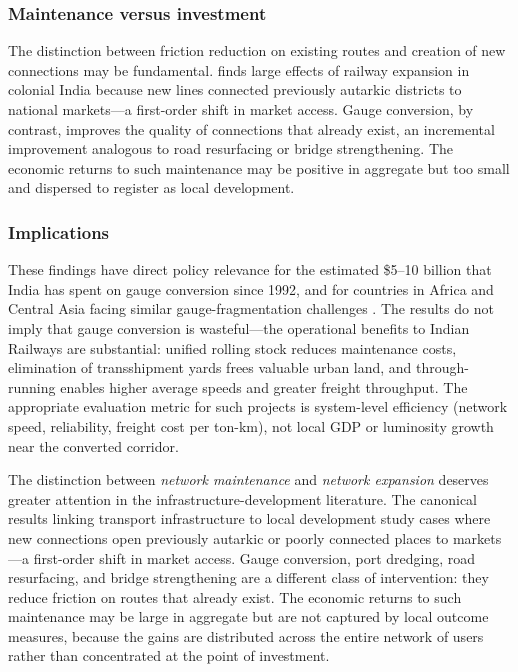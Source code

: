 \documentclass[12pt]{article}
\begin{document}
\subsubsection*{Maintenance versus investment} The distinction between friction reduction on existing routes and creation of new connections may be fundamental. \citet{donaldson2018railroads} finds large effects of railway expansion in colonial India because new lines connected previously autarkic districts to national markets---a first-order shift in market access. Gauge conversion, by contrast, improves the quality of connections that already exist, an incremental improvement analogous to road resurfacing or bridge strengthening. The economic returns to such maintenance may be positive in aggregate but too small and dispersed to register as local development.

\subsubsection*{Implications} These findings have direct policy relevance for the estimated \$5--10 billion that India has spent on gauge conversion since 1992, and for countries in Africa and Central Asia facing similar gauge-fragmentation challenges \citep{jedwab2017role}. The results do not imply that gauge conversion is wasteful---the operational benefits to Indian Railways are substantial: unified rolling stock reduces maintenance costs, elimination of transshipment yards frees valuable urban land, and through-running enables higher average speeds and greater freight throughput. The appropriate evaluation metric for such projects is system-level efficiency (network speed, reliability, freight cost per ton-km), not local GDP or luminosity growth near the converted corridor.

The distinction between \emph{network maintenance} and \emph{network expansion} deserves greater attention in the infrastructure-development literature. The canonical results linking transport infrastructure to local development \citep{donaldson2018railroads, asher2020rural, faber2014trade} study cases where new connections open previously autarkic or poorly connected places to markets---a first-order shift in market access. Gauge conversion, port dredging, road resurfacing, and bridge strengthening are a different class of intervention: they reduce friction on routes that already exist. The economic returns to such maintenance may be large in aggregate but are not captured by local outcome measures, because the gains are distributed across the entire network of users rather than concentrated at the point of investment.
\end{document}
